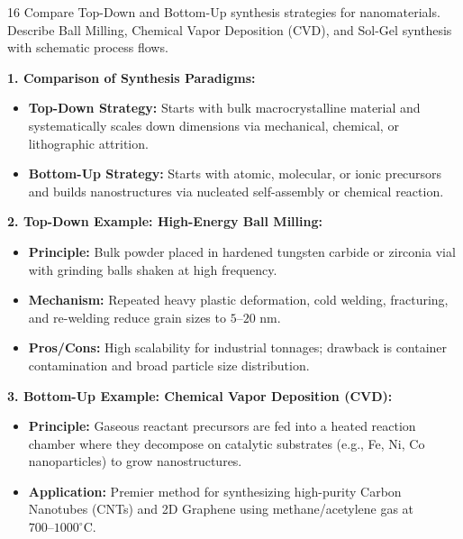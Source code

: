 \begin{theoryq}{16}
Compare Top-Down and Bottom-Up synthesis strategies for nanomaterials. Describe Ball Milling, Chemical Vapor Deposition (CVD), and Sol-Gel synthesis with schematic process flows.
\end{theoryq}
\begin{theorysol}
\textbf{1. Comparison of Synthesis Paradigms:}
\begin{itemize}
\item \textbf{Top-Down Strategy:} Starts with bulk macrocrystalline material and systematically scales down dimensions via mechanical, chemical, or lithographic attrition.
\item \textbf{Bottom-Up Strategy:} Starts with atomic, molecular, or ionic precursors and builds nanostructures via nucleated self-assembly or chemical reaction.
\end{itemize}

\textbf{2. Top-Down Example: High-Energy Ball Milling:}
\begin{itemize}
\item \textbf{Principle:} Bulk powder placed in hardened tungsten carbide or zirconia vial with grinding balls shaken at high frequency.
\item \textbf{Mechanism:} Repeated heavy plastic deformation, cold welding, fracturing, and re-welding reduce grain sizes to $5\text{--}20\text{ nm}$.
\item \textbf{Pros/Cons:} High scalability for industrial tonnages; drawback is container contamination and broad particle size distribution.
\end{itemize}

\textbf{3. Bottom-Up Example: Chemical Vapor Deposition (CVD):}
\begin{itemize}
\item \textbf{Principle:} Gaseous reactant precursors are fed into a heated reaction chamber where they decompose on catalytic substrates (e.g., Fe, Ni, Co nanoparticles) to grow nanostructures.
\item \textbf{Application:} Premier method for synthesizing high-purity Carbon Nanotubes (CNTs) and 2D Graphene using methane/acetylene gas at $700\text{--}1000^\circ\text{C}$.
\end{itemize}


\end{theorysol}
